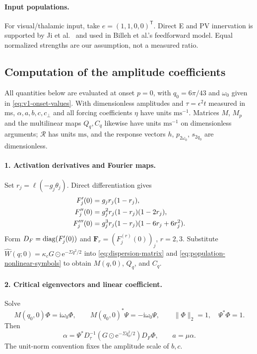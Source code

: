\documentclass[11pt]{article}
\newcommand{\ii}{\mathrm{i}}
\newcommand{\ee}{\mathrm{e}}
\newcommand{\cR}{\mathcal{R}}
\begin{document}
\paragraph{Input populations.}
For visual/thalamic input, take $e=(1,1,0,0)^{\mathsf T}$.
Direct E and PV innervation is supported by Ji et al.~\cite{ji2016}
and used in Billeh et al.'s feedforward model. Equal normalized strengths
are our assumption, not a measured ratio.

\subsection{Computation of the amplitude coefficients}
All quantities below are evaluated at onset $p=0$, with
$q_0=6\pi/43$ and $\omega_0$ given in \eqref{eq:v1-onset-values}.
With dimensionless amplitudes and $\tau=\epsilon^2t$ measured in ms,
$\alpha,a,b,c,c_\perp$ and all forcing coefficients $\eta$ have units
$\mathrm{ms}^{-1}$. Matrices $M$, $M_p$ and the multilinear maps $Q_q,C_q$
likewise have units $\mathrm{ms}^{-1}$ on dimensionless arguments;
$\cR$ has units $\mathrm{ms}$, and the response vectors $h$, $p_{2\omega_0}$,
$s_{2q_0}$ are dimensionless.

\paragraph{1. Activation derivatives and Fourier maps.}
Set $r_j=\ell(-g_j\theta_j)$. Direct differentiation gives
\begin{align}
 F'_j(0)&=g_jr_j(1-r_j),\notag\\
 F''_j(0)&=g_j^2r_j(1-r_j)(1-2r_j),\notag\\
 F'''_j(0)&=g_j^3r_j(1-r_j)(1-6r_j+6r_j^2).
 \label{eq:v1-activation-derivatives}
\end{align}
Form $D_F=\operatorname{diag}(F'_j(0))$ and $\boldsymbol F_r=(F_j^{(r)}(0))_j$,
$r=2,3$. Substitute $\widehat W(q;0)=\kappa_cG\odot\ee^{-\Sigma q^2/2}$
into \eqref{eq:dispersion-matrix} and
\eqref{eq:population-nonlinear-symbols} to obtain $M(q,0)$, $Q_q$, and $C_q$.

\paragraph{2. Critical eigenvectors and linear coefficient.}
Solve
\begin{equation}
 M(q_0,0)\Phi=\ii\omega_0\Phi,\qquad
 M(q_0,0)^*\Psi=-\ii\omega_0\Psi,\qquad
 \|\Phi\|_2=1,\quad\Psi^*\Phi=1.
\end{equation}
Then
\begin{equation}
 \alpha=\Psi^*D_\tau^{-1}
       (G\odot\ee^{-\Sigma q_0^2/2})D_F\Phi,\qquad a=\mu\alpha.
 \label{eq:v1-alpha-computation}
\end{equation}
The unit-norm convention fixes the amplitude scale of $b,c$.
\end{document}
